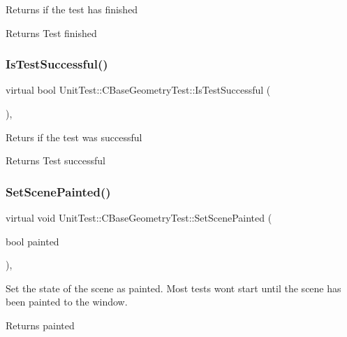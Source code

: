 Returns if the test has finished \begin{DoxyReturn}{Returns}
Test finished 
\end{DoxyReturn}
\mbox{\label{class_unit_test_1_1_c_base_geometry_test_aa824a0d8affc72e8bc68616dc38f0961}} 
\subsubsection{\texorpdfstring{IsTestSuccessful()}{IsTestSuccessful()}}
{\footnotesize\ttfamily virtual bool Unit\+Test\+::\+C\+Base\+Geometry\+Test\+::\+Is\+Test\+Successful (\begin{DoxyParamCaption}{ }\end{DoxyParamCaption})\hspace{0.3cm}{\ttfamily [inline]}, {\ttfamily [virtual]}}

Returs if the test was successful \begin{DoxyReturn}{Returns}
Test successful 
\end{DoxyReturn}
\mbox{\label{class_unit_test_1_1_c_base_geometry_test_a394a19d424a416ade87e4d09978337bf}} 
\subsubsection{\texorpdfstring{SetScenePainted()}{SetScenePainted()}}
{\footnotesize\ttfamily virtual void Unit\+Test\+::\+C\+Base\+Geometry\+Test\+::\+Set\+Scene\+Painted (\begin{DoxyParamCaption}\item[{bool}]{painted }\end{DoxyParamCaption})\hspace{0.3cm}{\ttfamily [inline]}, {\ttfamily [virtual]}}

Set the state of the scene as painted. Most tests won\textquotesingle{}t start until the scene has been painted to the window. \begin{DoxyReturn}{Returns}
painted 
\end{DoxyReturn}
\mbox{\label{class_unit_test_1_1_c_base_geometry_test_afe9560d667ef457f7a203453c10593fd}} 
